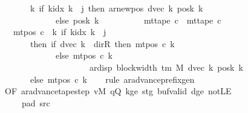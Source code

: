\begin{isabellebody}
\ \ \ \ \ \ \ \ \ \ \ \ \ \ {\isacharparenleft}{\kern0pt}{\isasymlambda}k{\isachardot}{\kern0pt}\ if\ k{\isacharunderscore}{\kern0pt}idx\ k\ {\isacharless}{\kern0pt}\ j\ then\ ar{\isacharunderscore}{\kern0pt}newpos\ {\isacharparenleft}{\kern0pt}dvec\ k{\isacharparenright}{\kern0pt}\ {\isacharparenleft}{\kern0pt}posk{}\ k{\isacharparenright}{\kern0pt}\isanewline
\ \ \ \ \ \ \ \ \ \ \ \ \ \ \ \ \ \ \ \ else\ posk{}\ k{\isacharparenright}{\kern0pt}{\isacharparenright}{\kern0pt}\isanewline
\ \ \ \ \ \ \ \ \ {\isasymand}\ mt{\isacharunderscore}{\kern0pt}tape\ c\ {\isacharequal}{\kern0pt}\ mt{\isacharunderscore}{\kern0pt}tape\ c{}\isanewline
\ \ \ \ \ \ \ \ \ {\isasymand}\ mt{\isacharunderscore}{\kern0pt}pos\ c\ {\isacharequal}{\kern0pt}\ {\isacharparenleft}{\kern0pt}{\isasymlambda}k{\isachardot}{\kern0pt}\ if\ k{\isacharunderscore}{\kern0pt}idx\ k\ {\isacharless}{\kern0pt}\ j\isanewline
\ \ \ \ \ \ \ \ \ \ \ \ \ \ then\ {\isacharparenleft}{\kern0pt}if\ dvec\ k\ {\isacharequal}{\kern0pt}\ dir{\isachardot}{\kern0pt}R\ then\ mt{\isacharunderscore}{\kern0pt}pos\ c{}\ k\isanewline
\ \ \ \ \ \ \ \ \ \ \ \ \ \ \ \ \ \ \ \ else\ mt{\isacharunderscore}{\kern0pt}pos\ c{}\ k\isanewline
\ \ \ \ \ \ \ \ \ \ \ \ \ \ \ \ \ \ \ \ \ \ \ \ \ \ \ {\isacharminus}{\kern0pt}\ ar{\isacharunderscore}{\kern0pt}disp\ {\isacharparenleft}{\kern0pt}block{\isacharunderscore}{\kern0pt}width\ {\isacharparenleft}{\kern0pt}{\isasymGamma}{\isacharunderscore}{\kern0pt}tm\ M{\isacharparenright}{\kern0pt}{\isacharparenright}{\kern0pt}\ {\isacharparenleft}{\kern0pt}dvec\ k{\isacharparenright}{\kern0pt}\ {\isacharparenleft}{\kern0pt}posk{}\ k{\isacharparenright}{\kern0pt}{\isacharparenright}{\kern0pt}\isanewline
\ \ \ \ \ \ \ \ \ \ \ \ \ \ else\ mt{\isacharunderscore}{\kern0pt}pos\ c{}\ k{\isacharparenright}{\kern0pt}{\isacharparenright}{\kern0pt}{\isachardoublequoteclose}\isanewline
%
\isadelimproof
\ \ %
\endisadelimproof
%
\isatagproof
{}\isamarkupfalse%
\ {\isacharparenleft}{\kern0pt}rule\ ar{\isacharunderscore}{\kern0pt}advance{\isacharunderscore}{\kern0pt}prefix{\isacharunderscore}{\kern0pt}gen\isanewline
\ \ \ \ \ \ \ \ {\isacharbrackleft}{\kern0pt}OF\ ar{\isacharunderscore}{\kern0pt}advance{\isacharunderscore}{\kern0pt}tape{\isacharunderscore}{\kern0pt}step\ vM\ qQ\ kge{}\ stg{}\ buf{\isacharunderscore}{\kern0pt}valid\ dge{}\ notLE\isanewline
\ \ \ \ \ \ \ \ \ \ \ \ pad{}\ src{}{\isacharbrackright}{\kern0pt}{\isacharparenright}{\kern0pt}%

\end{isabellebody}
